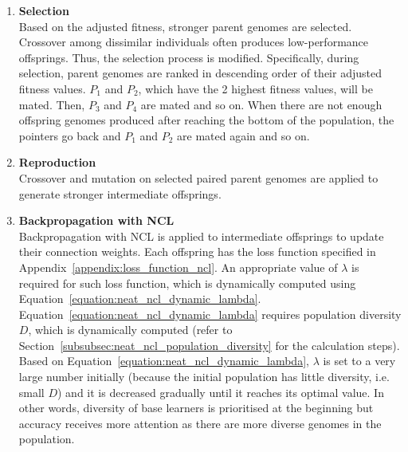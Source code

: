 \documentclass{article}
\begin{document}
\begin{enumerate}
\begin{lstlisting}[language=Python, caption={Modified fitness sharing}]
    for other_base_learner in population where other_base_learner is not current_base_learner:
        d = get_genetic_distance(current_base_learner, other_base_learner)

        if d < sigma:
            # current_base_learner is genetically too close to other_base_learner
            sharing_factor += 1 - (d / sigma) ** alpha
        
    # sharing_factor is ready

    # Update the raw fitness of the current base learner for fitness sharing
    current_base_learner.fitness = current_base_learner.fitness / sharing_factor
    \end{lstlisting}
    The fitness of every base learner is updated using the above algorithm. The updated fitness is called \textit{adjusted fitness}. 

    \item \textbf{Selection} \\
    Based on the adjusted fitness, stronger parent genomes are selected. Crossover among dissimilar individuals often produces low-performance offsprings. Thus, the selection process is modified. Specifically, during selection, parent genomes are ranked in descending order of their adjusted fitness values. $P_1$ and $P_2$, which have the 2 highest fitness values, will be mated. Then, $P_3$ and $P_4$ are mated and so on. When there are not enough offspring genomes produced after reaching the bottom of the population, the pointers go back and $P_1$ and $P_2$ are mated again and so on. 

    \item \textbf{Reproduction} \\
    Crossover and mutation on selected paired parent genomes are applied to generate stronger intermediate offsprings. 

    \item \textbf{Backpropagation with NCL} \\
    Backpropagation with NCL is applied to intermediate offsprings to update their connection weights. Each offspring has the loss function specified in Appendix~\ref{appendix:loss_function_ncl}. An appropriate value of $\lambda$ is required for such loss function, which is dynamically computed using Equation~\ref{equation:neat_ncl_dynamic_lambda}. Equation~\ref{equation:neat_ncl_dynamic_lambda} requires population diversity $D$, which is dynamically computed (refer to Section~\ref{subsubsec:neat_ncl_population_diversity} for the calculation steps). 
    Based on Equation~\ref{equation:neat_ncl_dynamic_lambda}, $\lambda$ is set to a very large number initially (because the initial population has little diversity, i.e. small $D$) and it is decreased gradually until it reaches its optimal value. In other words, diversity of base learners is prioritised at the beginning but accuracy receives more attention as there are more diverse genomes in the population. 


\end{enumerate}
\end{document}
